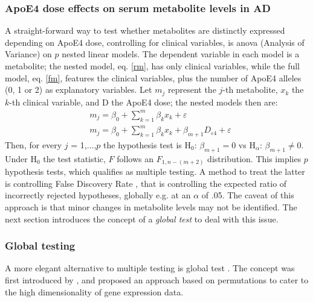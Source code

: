 \documentclass{amsart}
\theoremstyle{plain}
\begin{document}
\subsubsection{ApoE4 dose effects on serum metabolite levels in AD}
A straight-forward way to test whether metabolites are distinctly expressed depending on ApoE4 dose, controlling for clinical variables, is \acrshort{anova} (Analysis of Variance) on $p$ nested linear models. The dependent variable in each model is a metabolite; the nested model, eq. \eqref{rm}, has only clinical variables, while the full model, eq. \eqref{fm}, features the clinical variables, plus the number of ApoE4 alleles (0, 1 or 2) as explanatory variables. Let $m_j$ represent the $j$-th metabolite, $x_k$ the $k$-th clinical variable, and D the ApoE4 dose; the nested models then are:
\begin{align}
    & m_j = \beta_0 + \sum_{k=1}^m\beta_kx_k +\varepsilon \label{rm} \\
    & m_j = \beta_0 + \sum_{k=1}^m\beta_kx_k + \beta_{m+1}D_{\varepsilon4} + \varepsilon \label{fm}
\end{align}
Then, for every $j$ = 1,...,$p$ the hypothesis test is H$_0$: $\beta_{m+1} = 0 $ vs H$_\alpha$: $\beta_{m+1} \neq 0$. Under H$_0$ the test statistic, $F$ follows an $F_{1, n-(m+2)}$ distribution. This implies $p$ hypothesis tests, which qualifies as multiple testing. A method to treat the latter is controlling False Discovery Rate \cite{Benjamini1995ControllingTesting}, that is controlling the expected ratio of incorrectly rejected hypotheses, globally e.g. at an $\alpha$ of .05. The caveat of this approach is that minor changes in metabolite levels may not be identified. The next section introduces the concept of a \textit{global test} to deal with this issue.

\subsubsection{Global testing}
A more elegant alternative to multiple testing is global test \cite{Simon2004DesignHealth}. The concept was first introduced by \citeauthor{Simon2004DesignHealth}, and proposed an approach based on permutations to cater to the high dimensionality of gene expression data.
\end{document}
